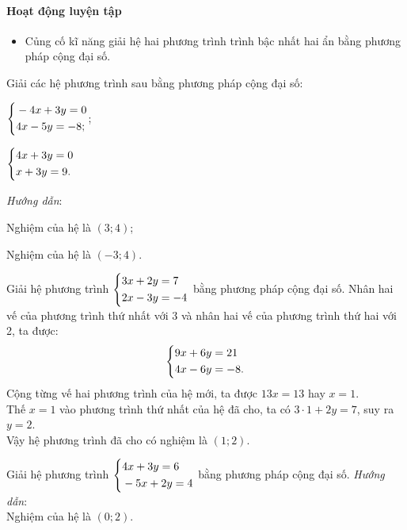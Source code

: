 \paragraph{Hoạt động luyện tập}

\muctieu

\begin{itemize}
    \item Củng cố kĩ năng giải hệ hai phương trình trình bậc nhất hai ẩn bằng phương pháp cộng đại số.
\end{itemize}

\noidungsanpham

\begin{luyentap}
    Giải các hệ phương trình sau bằng phương pháp cộng đại số:
    \begin{listEX}
        \item $\left\{\begin{aligned}&-4x + 3y = 0 \\ &4x - 5y = -8;\end{aligned}\right.$;
        \item $\left\{\begin{aligned}&4x + 3y = 0 \\ &x + 3y = 9.\end{aligned}\right.$
    \end{listEX}
    \doicot
    \textit{Hướng dẫn}:
    \begin{listEX}
        \item Nghiệm của hệ là $(3;4)$;
        \item Nghiệm của hệ là $(-3;4)$.
    \end{listEX}
\end{luyentap}

\begin{vidu}
    Giải hệ phương trình $\left\{\begin{aligned}&3x + 2y = 7 \\ &2x - 3y = -4\end{aligned}\right.$ bằng phương pháp cộng đại số.
    \doicot
    Nhân hai vế của phương trình thứ nhất với 3 và nhân hai vế của phương trình thứ hai với 2, ta được:
    $$\left\{\begin{aligned}&9x + 6y = 21 \\ &4x - 6y = -8.\end{aligned}\right.$$
    Cộng từng vế hai phương trình của hệ mới, ta được $13x = 13$ hay $x = 1$.\\
    Thế $x = 1$ vào phương trình thứ nhất của hệ đã cho, ta có $3 \cdot 1 + 2y = 7$, suy ra $y = 2$.\\
    Vậy hệ phương trình đã cho có nghiệm là $(1; 2)$.
\end{vidu}

\begin{luyentap}
    Giải hệ phương trình $\left\{\begin{aligned}&4x + 3y = 6 \\ &-5x + 2y = 4\end{aligned}\right.$ bằng phương pháp cộng đại số.
    \doicot
    \textit{Hướng dẫn}:\\
    Nghiệm của hệ là $(0;2)$.
\end{luyentap}

